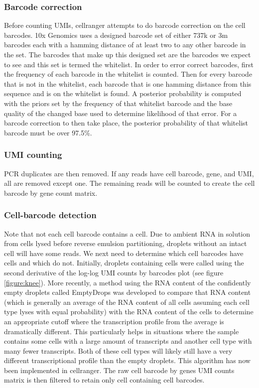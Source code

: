 \subsubsection{Barcode correction}
\par{
Before counting UMIs, cellranger attempts to do barcode correction on the cell barcodes. 10x Genomics uses a designed barcode set of either 737k or 3m barcodes each with a hamming distance\cite{hamming} of at least two to any other barcode in the set. The barcodes that make up this designed set are the barcodes we expect to see and this set is termed the whitelist. In order to error correct barcodes, first the frequency of each barcode in the whitelist is counted. Then for every barcode that is not in the whitelist, each barcode that is one hamming distance from this sequence and is on the whitelist is found. A posterior probability is computed with the priors set by the frequency of that whitelist barcode and the base quality of the changed base used to determine likelihood of that error. For a barcode correction to then take place, the posterior probability of that whitelist barcode must be over 97.5\%\cite{barcodecorrection}.
}

\subsubsection{UMI counting}

\par{
PCR duplicates are then removed. If any reads have cell barcode, gene, and UMI, all are removed except one. The remaining reads will be counted to create the cell barcode by gene count matrix. 
}



\subsubsection{Cell-barcode detection}
\par{
Note that not each cell barcode contains a cell. Due to ambient RNA in solution from cells lysed before reverse emulsion partitioning, droplets without an intact cell will have some reads. We next need to determine which cell barcodes have cells and which do not. Initially, droplets containing cells were called using the second derivative of the log-log UMI counts by barcodes plot (see figure \ref{figure:knee}). More recently, a method using the RNA content of the confidently empty droplets called EmptyDrops\cite{emptydrops} was developed to compare that RNA content (which is generally an average of the RNA content of all cells assuming each cell type lyses with equal probability) with the RNA content of the cells to determine an appropriate cutoff where the transcription profile from the average is dramatically different. This particularly helps in situations where the sample contains some cells with a large amount of transcripts and another cell type with many fewer transcripts. Both of these cell types will likely still have a very different transcriptional profile than the empty droplets. This algorithm has now been implemented in cellranger. The raw cell barcode by genes UMI counts matrix is then filtered to retain only cell containing cell barcodes.
}


